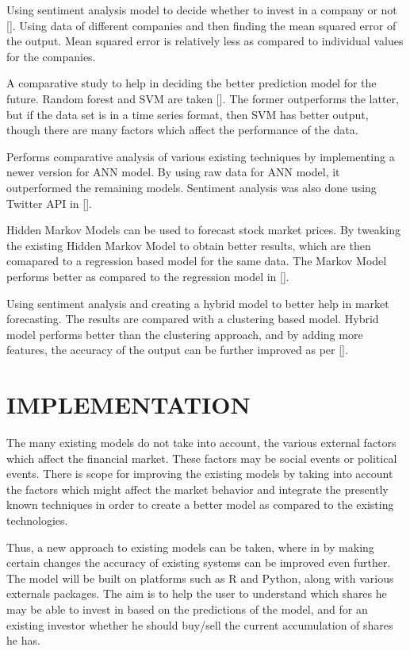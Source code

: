 \documentclass[BTech]{srmuthesis}
\begin{document}
Using sentiment analysis model to decide whether to invest in a company or not []. Using data of different companies and then finding the mean squared error of the output. Mean squared error is relatively less as compared to individual values for the companies.

A comparative study to help in deciding the better prediction model for the future. Random forest and SVM are taken []. The former outperforms the latter, but if the data set is in a time series format, then SVM has better output, though there are many factors which affect the performance of the data.

Performs comparative analysis of various existing techniques by implementing a newer version for ANN model. By using raw data for ANN model, it outperformed the remaining models. Sentiment analysis was also done using Twitter API in [].

Hidden Markov Models can be used to forecast stock market prices. By tweaking the existing Hidden Markov Model to obtain better results, which are then comapared to a regression based model for the same data. The Markov Model performs better as compared to the regression model in [].

Using sentiment analysis and creating a hybrid model to better help in market forecasting. The results are compared with a clustering based model. Hybrid model performs better than the clustering approach, and by adding more features, the accuracy of the output can be further improved as per [].
\pagebreak

\chapter{IMPLEMENTATION}
The many existing models do not take into account, the various external factors which affect the financial market. These factors may be social events or political events. There is scope for improving the existing models by taking into account the factors which might affect the market behavior and integrate the presently known techniques in order to create a better model as compared to the existing technologies.

Thus, a new approach to existing models can be taken, where in by making certain changes the accuracy of existing systems can be improved even further. The model will be built on platforms such as R and Python, along with various externals packages. The aim is to help the user to understand which shares he may be able to invest in based on the predictions of the model, and for an existing investor whether he should buy/sell the current accumulation of shares he has.
\end{document}
